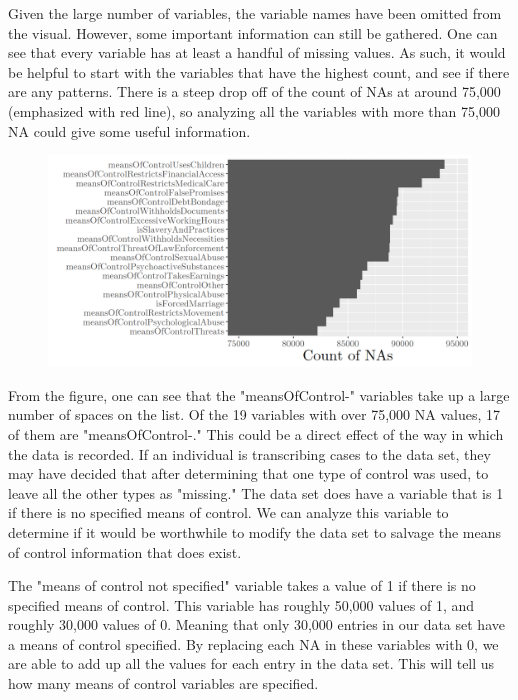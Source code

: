 \documentclass{article} %
\begin{document}
	Given the large number of variables, the variable names have been omitted from the visual. However, some important information can still be gathered. One can see that every variable has at least a handful of missing values. As such, it would be helpful to start with the variables that have the highest count, and see if there are any patterns. There is a steep drop off of the count of NAs at around 75,000 (emphasized with red line), so analyzing all the variables with more than 75,000 NA could give some useful information.
	
	\begin{figure}[H]
		\includegraphics[width = \textwidth]{NABarplot2}
	\end{figure}
	
	From the figure, one can see that the "meansOfControl-" variables take up a large number of spaces on the list. Of the 19 variables with over 75,000 NA values, 17 of them are "meansOfControl-." This could be a direct effect of the way in which the data is recorded. If an individual is transcribing cases to the data set, they may have decided that after determining that one type of control was used, to leave all the other types as "missing." The data set does have a variable that is 1 if there is no specified means of control. We can analyze this variable to determine if it would be worthwhile to modify the data set to salvage the means of control information that does exist.
	
	The "means of control not specified" variable takes a value of 1 if there is no specified means of control. This variable has roughly 50,000 values of 1, and roughly 30,000 values of 0. Meaning that only 30,000 entries in our data set have a means of control specified. By replacing each NA in these variables with 0, we are able to add up all the values for each entry in the data set. This will tell us how many means of control variables are specified.
	
\end{document}
